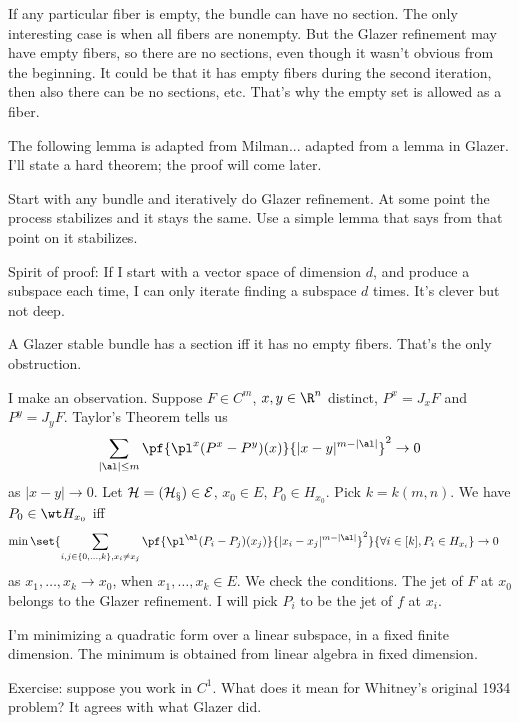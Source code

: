 If any particular fiber is empty, the bundle can have no section. The only interesting case is when all fibers are nonempty. But the Glazer refinement may have empty fibers, so there are no sections, even though it wasn't obvious from the beginning. It could be that it has empty fibers during the second iteration, then also there can be no sections, etc. That's why the empty set is allowed as a fiber.

The following lemma is adapted from Milman... adapted from a lemma in Glazer. I'll state a hard theorem; the proof will come later.

Start with any bundle and iteratively do Glazer refinement. At some point the process stabilizes and it stays the same. 
Use a simple lemma that says from that point on it stabilizes.

Spirit of proof: If I start with a vector space of dimension $d$, and produce a subspace each time, I can only iterate finding a subspace  $d$ times. It's clever but not deep.

A Glazer stable bundle has a section iff it has no empty fibers. That's the only obstruction.

I make an observation. Suppose $F\in C^m$, $x,y\in \R^n$ distinct, $P^x = J_xF$ and $P^y = J_yF$. Taylor's Theorem tells us
\begin{align}
\sum_{|\al|\le m}
\pf{\pl^x(P^x-P^y)(x)}{|x-y|^{m-|\al|}}^2
\to 0
\label{eq:taylor-inf}
\end{align}
as $|x-y|\to 0$. Let $\cal H=(H_x)\in E$, $x_0\in E$, $P_0\in H_{x_0}$. Pick $k=k(m,n)$.
We have $P_0\in \wt H_{x_0}$ iff
\begin{align}
\min\set{
\sum_{i,j\in \{0,\ldots, k\}, x_i\ne x_j}
\pf{\pl^\al(P_i-P_j)(x_j)}{|x_i-x_j|^{m-|\al|}}^2
}{\forall i\in [k], P_i\in H_{x_i} }
&\to 0
\end{align}
as $x_1,\ldots, x_k\to x_0$, when $x_1,\ldots, x_k\in E$. 
We check the conditions. 
The jet of $F$ at $x_0$ belongs to the Glazer refinement. I will pick $P_i$ to be the jet of $f$ at $x_i$. %

I'm minimizing a quadratic form over a linear subspace, in a fixed finite dimension. The minimum is obtained from linear algebra in fixed dimension.

Exercise: suppose you work in $C^1$. What does it mean for Whitney's original 1934 problem? It agrees with what Glazer did.

